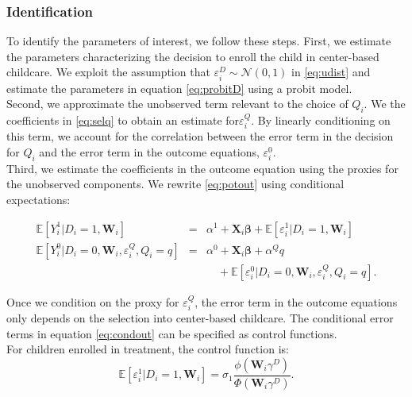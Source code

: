 \begin{appendices}
\subsubsection{Identification}

\noindent To identify the parameters of interest, we follow these steps. First, we estimate the parameters characterizing the decision to enroll the child in center-based childcare. We exploit the assumption that $\varepsilon_{i}^D \sim \mathcal{N} \left( 0, 1 \right)$ in \eqref{eq:udist} and estimate the parameters in equation \eqref{eq:probitD} using a probit model.\\

\noindent Second, we approximate the unobserved term relevant to the choice of $Q_{i}$. We the coefficients in \eqref{eq:selq} to obtain an estimate for$\varepsilon^{Q}_i$. By linearly conditioning on this term, we account for the correlation between the error term in the decision for $Q_{i}$ and the error term in the outcome equations, $\varepsilon_i^0$.\\

\noindent Third, we estimate the coefficients in the outcome equation using the proxies for the unobserved components. We rewrite \eqref{eq:potout} using conditional expectations:

\begin{eqnarray}
\mathbb{E}\left[Y_i^1|D_i=1,\mathbf{W}_i\right]                         &=& \alpha^1+\mathbf{X}_i\mathbf{\beta}              +\mathbb{E}\left[\varepsilon_i^1|D_i=1,\mathbf{W}_i      \right] \nonumber \\
\mathbb{E}\left[Y_i^0|D_i=0,\mathbf{W}_i,\varepsilon^{Q}_i,Q_i=q\right] &=& \alpha^0+\mathbf{X}_i\mathbf{\beta} +\alpha^Q q \label{eq:condout} \\ \nonumber && \quad + \mathbb{E}\left[\varepsilon_i^0|D_i=0,\mathbf{W}_i,\varepsilon^{Q}_i,Q_i=q\right].
\end{eqnarray}

\noindent Once we condition on the proxy for $\varepsilon^{Q}_i$, the error term in the outcome equations only depends on the selection into center-based childcare. The conditional error terms in equation \eqref{eq:condout} can be specified as control functions.\\ 

\noindent For children enrolled in treatment, the control function is: 
\begin{equation}
\mathbb{E} \left[\varepsilon_i^1|D_i=1,\mathbf{W}_i \right]=\sigma_1\frac{\phi \left( \mathbf{W}_i \gamma^D \right) }{ \Phi \left( \mathbf{W}_i \gamma^D \right) }. \label{eq:contam}
\end{equation}


\end{appendices}

